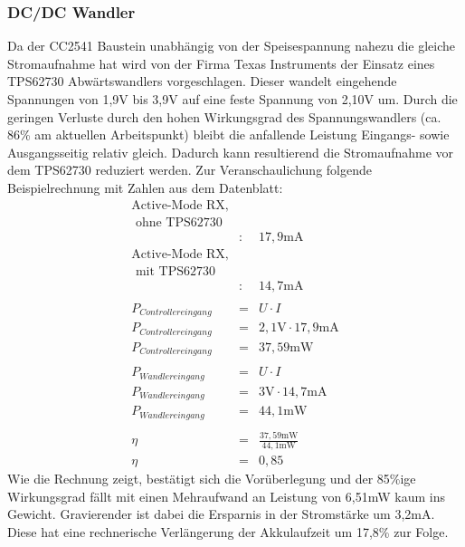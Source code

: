 \documentclass[12pt]{scrreprt} %
\begin{document}
\subsubsection{DC/DC Wandler}
Da der CC2541 Baustein unabhängig von der Speisespannung nahezu die gleiche Stromaufnahme hat \citep[vgl. S. 21]{CC2541} wird von der Firma Texas Instruments der Einsatz eines TPS62730 Abwärtswandlers vorgeschlagen. Dieser wandelt eingehende Spannungen von 1,9V bis 3,9V auf eine feste Spannung von 2,10V um.  Durch die geringen Verluste durch den hohen Wirkungsgrad des Spannungswandlers (ca. 86\% am aktuellen Arbeitspunkt) bleibt die anfallende Leistung Eingangs- sowie Ausgangsseitig relativ gleich. Dadurch kann resultierend die Stromaufnahme vor dem TPS62730 reduziert werden. Zur Veranschaulichung folgende Beispielrechnung mit Zahlen aus dem Datenblatt:
\begin{eqnarray}
\text{Active-Mode RX,}&&\nonumber\\
\text{ ohne TPS62730}&&\nonumber\\
&:&17,9\text{mA}\nonumber\\
\text{Active-Mode RX,}&&\nonumber\\
\text{ mit TPS62730}&&\nonumber\\
&:&14,7\text{mA}\nonumber\\
\nonumber\\
P_{Controllereingang}&=&U \cdot I\\
P_{Controllereingang}&=&2,1\text{V} \cdot 17,9 \text{mA}\\
P_{Controllereingang}&=&37,59 \text{mW}\\
\nonumber\\
P_{Wandlereingang}&=& U \cdot I\\
P_{Wandlereingang}&=&3\text{V} \cdot 14,7 \text{mA}\\
P_{Wandlereingang}&=&44,1 \text{mW}\\
\nonumber\\
\eta&=&\frac{37,59\text{mW}}{44,1\text{mW}}\\
\eta&=&0,85
\end{eqnarray}
Wie die Rechnung zeigt, bestätigt sich die Vorüberlegung und der 85\%ige Wirkungsgrad fällt mit einen Mehraufwand an Leistung von 6,51mW kaum ins Gewicht. Gravierender ist dabei die Ersparnis in der Stromstärke um 3,2mA. Diese hat eine rechnerische Verlängerung der Akkulaufzeit um 17,8\% zur Folge.
\end{document}
